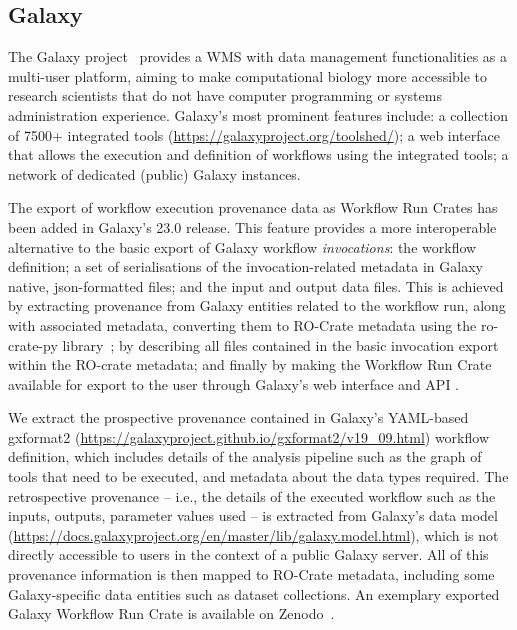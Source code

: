 \documentclass[10pt,letterpaper]{article}
\begin{document}
\subsection{Galaxy}\label{galaxy}

The Galaxy project~\cite{Galaxy 2022} provides a WMS with data management functionalities as a multi-user platform, aiming to make computational biology more accessible to research scientists that do not have computer programming or systems administration experience.
Galaxy's most prominent features include: a collection of 7500+ integrated tools (\url{https://galaxyproject.org/toolshed/});
a web interface that allows the execution and definition of workflows using the integrated tools; a network of dedicated (public) Galaxy instances.

The export of workflow execution provenance data as Workflow Run Crates has been added in Galaxy's 23.0 release.
This feature provides a more interoperable alternative to the basic export of Galaxy workflow
\emph{invocations}: the workflow definition; a set of serialisations of the invocation-related metadata in Galaxy native, json-formatted files;
and the input and output data files.
This is achieved by extracting provenance from Galaxy entities related to the workflow run, along with associated metadata, converting them to RO-Crate metadata using the ro-crate-py library~\cite{ro-crate-py}; by describing all files contained in the basic invocation export within the RO-crate metadata;
and finally by making the Workflow Run Crate available for export to the user through Galaxy's web interface and API \cite{De Geest 2022b}.

We extract the prospective provenance contained in Galaxy's YAML-based gxformat2
(\url{https://galaxyproject.github.io/gxformat2/v19_09.html}) workflow definition, which includes details of the analysis pipeline such as the graph of tools that need to be executed, and metadata about the data types required.
The retrospective provenance -- i.e., the details of the executed workflow such as the inputs, outputs, parameter values used -- is extracted from Galaxy's data model (\url{https://docs.galaxyproject.org/en/master/lib/galaxy.model.html}), which is not directly accessible to users in the context of a public Galaxy server.
All of this provenance information is then mapped to RO-Crate metadata, including some Galaxy-specific data entities such as dataset collections.
An exemplary exported Galaxy Workflow Run Crate is available on Zenodo~\cite{De Geest 2023}.
\end{document}
